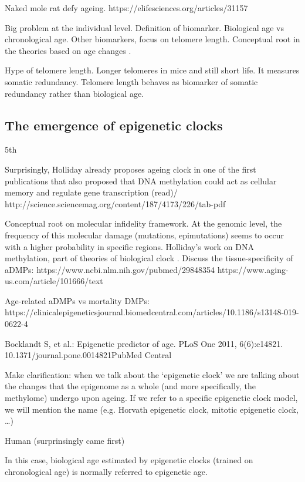Naked mole rat defy ageing. https://elifesciences.org/articles/31157


Big problem at the individual level. Definition of biomarker. Biological age vs chronological age. Other biomarkers, focus on telomere length. 
Conceptual root in the theories based on age changes \cite{Medvedev1990}.

Hype of telomere length. Longer telomeres in mice and still short life.
It measures somatic redundancy. Telomere length behaves as biomarker of somatic redundancy rather than biological age.

\subsection{The emergence of epigenetic clocks}

5th

Surprisingly, Holliday already proposes ageing clock in one of the first publications that also proposed that DNA methylation could act as cellular memory and regulate gene transcription (read)/ http://science.sciencemag.org/content/187/4173/226/tab-pdf

Conceptual root on molecular infidelity framework. At the genomic level, the frequency of this molecular damage (mutations, epimutations) seems to occur with a higher probability in specific regions. 
Holliday's work on DNA methylation, part of theories of biological clock \cite{Medvedev1990}. 
Discuss the tissue-specificity of aDMPs:
https://www.ncbi.nlm.nih.gov/pubmed/29848354
https://www.aging-us.com/article/101666/text

Age-related aDMPs vs mortality DMPs:
https://clinicalepigeneticsjournal.biomedcentral.com/articles/10.1186/s13148-019-0622-4

Bocklandt S, et al.: Epigenetic predictor of age. PLoS One 2011, 6(6):e14821. 10.1371/journal.pone.0014821PubMed Central

Make clarification: when we talk about the ‘epigenetic clock’ we are talking about the changes that the epigenome as a whole (and more specifically, the methylome) undergo upon ageing. If we refer to a specific epigenetic clock model, we will mention the name (e.g. Horvath epigenetic clock, mitotic epigenetic clock, …)

Human (surprinsingly came first)

In this case, biological age estimated by epigenetic clocks (trained on chronological age) is normally referred to epigenetic age. 

